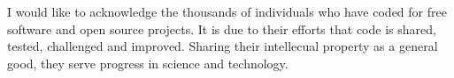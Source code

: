 

\begin{acknowledgements}      %

  I would like to acknowledge the thousands of individuals who have
  coded for free software and open source projects. It is due to their
  efforts that code is shared, tested, challenged and
  improved. Sharing their intellecual property as a general good, they
  serve progress in science and technology.

\end{acknowledgements}



